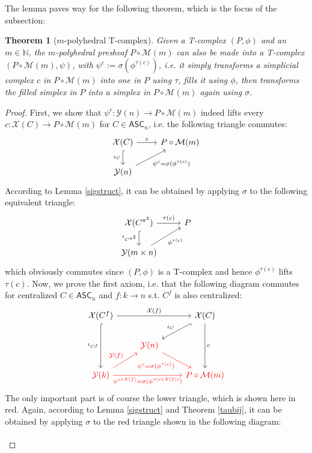 \documentclass{article}
\newtheorem{theorem}{Theorem}[subsection]
\theoremstyle{remark}
\theoremstyle{definition}
\newcommand{\N}{\mathbb N}
\newcommand{\ASC}{\mathsf{ASC}}
\newcommand{\Y}{\mathcal Y}
\newcommand{\X}{\mathcal X}
\newcommand{\M}{\mathcal M}
\begin{document}
	The lemma paves way for the following theorem, which is the focus of the subsection:
	\begin{theorem}[$m$-polyhedral T-complex]
		Given a T-complex $(P,\phi)$ and an $m\in\N$, the $m$-polyhedral presheaf $P\circ\M(m)$ can also be made into a T-complex $(P\circ\M(m),\psi)$, with $\psi^c:=\sigma(\phi^{\tau(c)})$, i.e. it simply transforms a simplicial complex $c$ in $P\circ\M(m)$ into one in $P$ using $\tau$, fills it using $\phi$, then transforms the filled simplex in $P$ into a simplex in $P\circ\M(m)$ again using $\sigma$.
	\end{theorem}
	\begin{proof}
		First, we show that $\psi^c:\Y(n)\to P\circ\M(m)$ indeed lifts every $c:\X(C)\to P\circ\M(m)$ for $C\in\ASC_n$, i.e. the following triangle commutes:
		\[\begin{tikzcd}
			\X(C)\arrow{r}{c}\arrow[hook]{d}[swap]{\iota_C}&P\circ\M(m)\\
			\Y(n)\arrow{ur}[swap]{\psi^c=\sigma(\phi^{\tau(c)})}
		\end{tikzcd}\]
		According to Lemma \ref{sigstruct}, it can be obtained by applying $\sigma$ to the following equivalent triangle:
		\[\begin{tikzcd}
			\X(C^{\pi^2})\arrow{r}{\tau(c)}\arrow[hook]{d}[swap]{\iota_{C^{\pi^2}}}&P\\
			\Y(m\times n)\arrow{ur}[swap]{\phi^{\tau(c)}}
		\end{tikzcd}\]
		which obviously commutes since $(P,\phi)$ is a T-complex and hence $\phi^{\tau(c)}$ lifts $\tau(c)$.
		Now, we prove the first axiom, i.e. that the following diagram commutes for centralized $C\in\ASC_n$ and $f:k\to n$ s.t. $C^f$ is also centralized:
		\[\begin{tikzcd}
			\X(C^f)\arrow{rr}{\X(f)}\arrow[hook]{dd}[swap]{\iota_{C^f}}&&\X(C)\arrow{dd}{c}\arrow[hook]{ld}[swap]{\iota_C}\\
			&\color{red}{\Y(n)}\arrow[color=red]{dr}[swap]{\psi^c=\sigma(\phi^{\tau(c)})}\\
			\color{red}{\Y(k)}\arrow[color=red]{ur}{\Y(f)}\arrow[color=red]{rr}[swap]{\psi^{c\circ\X(f)}=\sigma(\phi^{\tau(c\circ\X(f))})}&&\color{red}{P\circ\M(m)}
		\end{tikzcd}\]
		The only important part is of course the lower triangle, which is shown here in red. Again, according to Lemma \ref{sigstruct} and Theorem \ref{taubij}, it can be obtained by applying $\sigma$ to the red triangle shown in the following diagram:
		\[\begin{tikzcd}

\end{tikzcd}\]
\end{proof}
\end{document}
